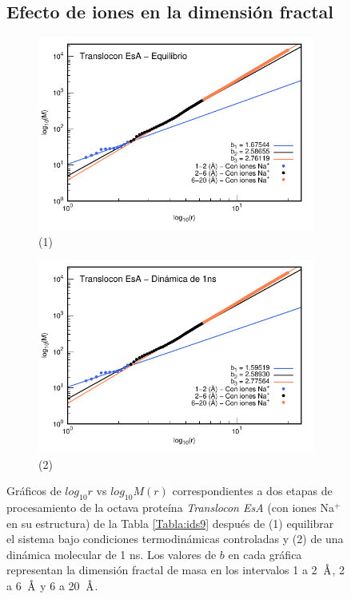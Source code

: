 	
	
	
	\begin{figure}[H]
		\subsection*{Efecto de iones en la dimensi\'{o}n fractal}	
		\centering
		\begin{subfigure}{0.49\textwidth}
			\centering
			\includegraphics[width=\linewidth,page=1]{graphs/PDBs/7khw/ions/7khwEq-wions.pdf}
			\caption{(1)}
		\end{subfigure}
		\hfill
		\begin{subfigure}{0.49\textwidth}
			\centering
			\includegraphics[width=\linewidth,page=1]{graphs/PDBs/7khw/ions/7khw1ns-wions.pdf}
			\caption{(2)}
		\end{subfigure}
		\caption{Gr\'{a}ficos de $log_{10}r$ vs $log_{10}M(r)$ correspondientes a dos etapas de procesamiento de la octava prote\'{i}na \textit{Translocon EsA} (con iones Na$^{+}$ en su estructura) de la Tabla \ref{Tabla:ids9} despu\'{e}s de (1) equilibrar el sistema bajo condiciones termodin\'{a}micas controladas y (2) de una din\'{a}mica molecular de 1 ns. Los valores de $b$ en cada gr\'{a}fica representan la dimensi\'{o}n fractal de masa en los intervalos 1 a 2~$\textup{\r{A}}$, 2 a 6~$\textup{\r{A}}$ y 6 a 20~$\textup{\r{A}}$.}
		\label{fig:7khw-wions}
	\end{figure}
	
